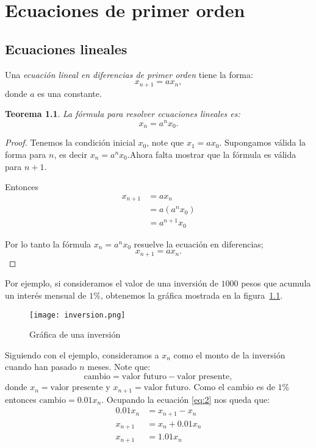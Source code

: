 \documentclass{report}
\newtheorem{teorema}{Teorema}[chapter]
\begin{document}
\chapter{Ecuaciones de primer orden}

\section{Ecuaciones lineales}

Una \emph{ecuación lineal en diferencias de primer orden} tiene la forma:
\begin{equation}
  \label{lineal}
  x_{n+1}=ax_n,
\end{equation}
donde $a$ es una constante.

\begin{teorema}
La fórmula para resolver ecuaciones lineales es:
\begin{equation}
  \label{rum}
  x_n=a^nx_0.
\end{equation}
\end{teorema}

\begin{proof}
Tenemos la condición inicial $x_0$, note que $x_1=ax_0$.  Supongamos
válida la forma para $n$, es decir $x_n=a^nx_0$.Ahora falta mostrar que
la fórmula es válida para $n+1$.

Entonces
\begin{align*}
  x_{n+1}&=ax_n\\
        &=a(a^nx_0)\\
       &=a^{n+1}x_0
\end{align*}

Por lo tanto la fórmula $x_n=a^nx_0$ resuelve la ecuación en
diferencias; $$x_{n+1}=ax_n.$$
\end{proof}

Por ejemplo, si consideramos el valor de una inversión de $1000$ pesos
que acumula un interés mensual de $1\%$, obtenemos la gráfica mostrada
en la figura~\ref{inversion}.

\begin{figure}
  \centering
  \texttt{[image: inversion.png]}
  \caption{Gráfica de una inversión}
  \label{inversion}
\end{figure}

Siguiendo con el ejemplo, consideramos a $x_n$ como el monto
de la inversión cuando han pasado $n$ meses.  Note que:
\begin{equation}
  \label{eq:2}
  \text{cambio}=\text{valor futuro}-\text{valor presente},
\end{equation}
donde $x_n=\text{valor presente}$ y $x_{n+1}=\text{valor futuro}$.
Como el cambio es de $1\%$ entonces $\text{cambio}=0.01x_n$.  Ocupando la ecuación
\eqref{eq:2} nos queda que:
\begin{align*}
  0.01x_n&=x_{n+1}-x_n\\
  x_{n+1}&=x_n+0.01x_n\\
 x_{n+1}&=1.01x_n
\end{align*}
\end{document}
